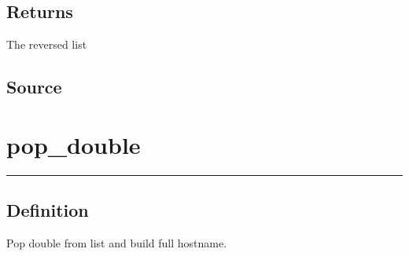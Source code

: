 \documentclass[letterpaper,10pt,english]{sphinxmanual}
\begin{document}
\subsection{Returns}
\label{\detokenize{OA/reverse:returns}}
\sphinxAtStartPar
{}

\sphinxAtStartPar
The reversed list


\subsection{Source}
\label{\detokenize{OA/reverse:source}}
\begin{sphinxVerbatim}[commandchars=\\\{\}]
 

        \PYG{p}{[}\PYG{p}{]}
           
                 \PYG{p}{[}\PYG{p}{]}
                        \PYG{p}{[}\PYG{p}{]}
         
\end{sphinxVerbatim}

\sphinxstepscope

\newpage
\section{pop\_double}
\label{\detokenize{OA/pop_double:pop-double}}\label{\detokenize{OA/pop_double::doc}}
\begin{sphinxVerbatim}[commandchars=\\\{\}]
 
\end{sphinxVerbatim}


\bigskip\hrule\bigskip



\subsection{Definition}
\label{\detokenize{OA/pop_double:definition}}
\sphinxAtStartPar
Pop double from list and build full hostname.
\end{document}
